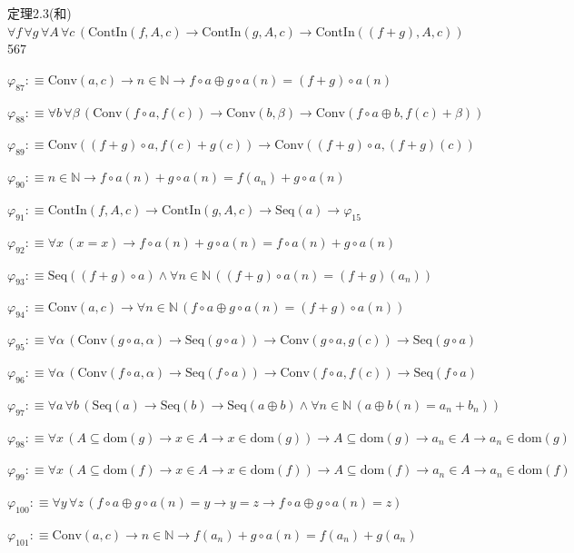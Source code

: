 \begin{fullproof}{定理2.3(和)}{$\forall f\,\forall g\,\forall A\,\forall c\,(\mathrm{ContIn}(f,A,c) \to \mathrm{ContIn}(g,A,c) \to \mathrm{ContIn}((f + g),A,c))$}{567}
\begin{abbrevlist}
\item $\varphi_{87} :\equiv \mathrm{Conv}(a,c) \to n \in \mathbb{N} \to f \circ a \oplus g \circ a(n) = (f + g) \circ a(n)$
\item $\varphi_{88} :\equiv \forall b\,\forall \beta\,(\mathrm{Conv}(f \circ a,f(c)) \to \mathrm{Conv}(b,\beta) \to \mathrm{Conv}(f \circ a \oplus b,f(c) + \beta))$
\item $\varphi_{89} :\equiv \mathrm{Conv}((f + g) \circ a,f(c) + g(c)) \to \mathrm{Conv}((f + g) \circ a,(f + g)(c))$
\item $\varphi_{90} :\equiv n \in \mathbb{N} \to f \circ a(n) + g \circ a(n) = f(a_{n}) + g \circ a(n)$
\item $\varphi_{91} :\equiv \mathrm{ContIn}(f,A,c) \to \mathrm{ContIn}(g,A,c) \to \mathrm{Seq}(a) \to \varphi_{15}$
\item $\varphi_{92} :\equiv \forall x\,(x = x) \to f \circ a(n) + g \circ a(n) = f \circ a(n) + g \circ a(n)$
\item $\varphi_{93} :\equiv \mathrm{Seq}((f + g) \circ a) \land \forall n \in \mathbb{N}\,((f + g) \circ a(n) = (f + g)(a_{n}))$
\item $\varphi_{94} :\equiv \mathrm{Conv}(a,c) \to \forall n \in \mathbb{N}\,(f \circ a \oplus g \circ a(n) = (f + g) \circ a(n))$
\item $\varphi_{95} :\equiv \forall \alpha\,(\mathrm{Conv}(g \circ a,\alpha) \to \mathrm{Seq}(g \circ a)) \to \mathrm{Conv}(g \circ a,g(c)) \to \mathrm{Seq}(g \circ a)$
\item $\varphi_{96} :\equiv \forall \alpha\,(\mathrm{Conv}(f \circ a,\alpha) \to \mathrm{Seq}(f \circ a)) \to \mathrm{Conv}(f \circ a,f(c)) \to \mathrm{Seq}(f \circ a)$
\item $\varphi_{97} :\equiv \forall a\,\forall b\,(\mathrm{Seq}(a) \to \mathrm{Seq}(b) \to \mathrm{Seq}(a \oplus b) \land \forall n \in \mathbb{N}\,(a \oplus b(n) = a_{n} + b_{n}))$
\item $\varphi_{98} :\equiv \forall x\,(A \subseteq \mathrm{dom}(g) \to x \in A \to x \in \mathrm{dom}(g)) \to A \subseteq \mathrm{dom}(g) \to a_{n} \in A \to a_{n} \in \mathrm{dom}(g)$
\item $\varphi_{99} :\equiv \forall x\,(A \subseteq \mathrm{dom}(f) \to x \in A \to x \in \mathrm{dom}(f)) \to A \subseteq \mathrm{dom}(f) \to a_{n} \in A \to a_{n} \in \mathrm{dom}(f)$
\item $\varphi_{100} :\equiv \forall y\,\forall z\,(f \circ a \oplus g \circ a(n) = y \to y = z \to f \circ a \oplus g \circ a(n) = z)$
\item $\varphi_{101} :\equiv \mathrm{Conv}(a,c) \to n \in \mathbb{N} \to f(a_{n}) + g \circ a(n) = f(a_{n}) + g(a_{n})$

\end{abbrevlist}
\end{fullproof}
